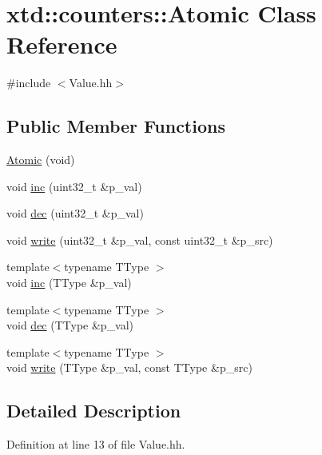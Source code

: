 \hypertarget{classxtd_1_1counters_1_1Atomic}{}\section{xtd\+:\+:counters\+:\+:Atomic Class Reference}
\label{classxtd_1_1counters_1_1Atomic}


{\ttfamily \#include $<$Value.\+hh$>$}

\subsection*{Public Member Functions}
\begin{DoxyCompactItemize}
\item 
\hyperlink{classxtd_1_1counters_1_1Atomic_a54a3a8f1a29283e78a495fdd410fc3c4}{Atomic} (void)
\item 
void \hyperlink{classxtd_1_1counters_1_1Atomic_a88c5f887b5d7b70f1da87b393f12bccc}{inc} (uint32\+\_\+t \&p\+\_\+val)
\item 
void \hyperlink{classxtd_1_1counters_1_1Atomic_adb613d1d33a70c6e17d1896058a110fe}{dec} (uint32\+\_\+t \&p\+\_\+val)
\item 
void \hyperlink{classxtd_1_1counters_1_1Atomic_a90c6aa9ad58612b867df2bbdc779ca3b}{write} (uint32\+\_\+t \&p\+\_\+val, const uint32\+\_\+t \&p\+\_\+src)
\item 
{\footnotesize template$<$typename T\+Type $>$ }\\void \hyperlink{classxtd_1_1counters_1_1Atomic_adf3283f7fc1cf51af28ea2aa5822f272}{inc} (T\+Type \&p\+\_\+val)
\item 
{\footnotesize template$<$typename T\+Type $>$ }\\void \hyperlink{classxtd_1_1counters_1_1Atomic_a2bf93bdc52005c846ac43bb2afcac8f5}{dec} (T\+Type \&p\+\_\+val)
\item 
{\footnotesize template$<$typename T\+Type $>$ }\\void \hyperlink{classxtd_1_1counters_1_1Atomic_a53755a00d69b11274593f62737d9a54a}{write} (T\+Type \&p\+\_\+val, const T\+Type \&p\+\_\+src)
\end{DoxyCompactItemize}


\subsection{Detailed Description}


Definition at line 13 of file Value.\+hh.



